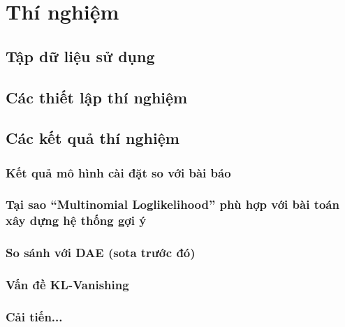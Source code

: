 \chapter{Thí nghiệm}
\label{Chapter4}

\section{Tập dữ liệu sử dụng}
\section{Các thiết lập thí nghiệm}
\section{Các kết quả thí nghiệm}
    \subsection{Kết quả mô hình cài đặt so với bài báo}
    \subsection{Tại sao ``Multinomial Loglikelihood'' phù hợp với bài toán xây dựng hệ thống gợi ý}
    \subsection{So sánh với DAE (sota trước đó)}
    \subsection{Vấn đề KL-Vanishing}
    \subsection{Cải tiến...}